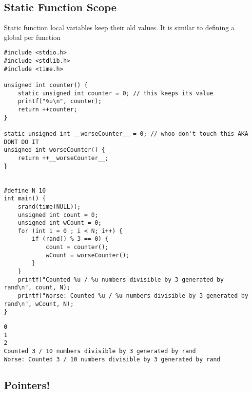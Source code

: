\documentclass[11pt]{article}
\begin{document}
\subsection{Static Function Scope}
\label{sec:org18c383b}

Static function local variables keep their old values. It is similar
to defining a global per function

\begin{verbatim}
#include <stdio.h>
#include <stdlib.h>
#include <time.h>

unsigned int counter() {
    static unsigned int counter = 0; // this keeps its value
    printf("%u\n", counter);
    return ++counter;
}

static unsigned int __worseCounter__ = 0; // whoo don't touch this AKA DONT DO IT
unsigned int worseCounter() {
    return ++__worseCounter__;
}


#define N 10
int main() {
    srand(time(NULL));
    unsigned int count = 0;
    unsigned int wCount = 0;
    for (int i = 0 ; i < N; i++) {
        if (rand() % 3 == 0) {
            count = counter();
            wCount = worseCounter();
        }
    }
    printf("Counted %u / %u numbers divisible by 3 generated by rand\n", count, N);
    printf("Worse: Counted %u / %u numbers divisible by 3 generated by rand\n", wCount, N);
}
\end{verbatim}

\begin{verbatim}
0
1
2
Counted 3 / 10 numbers divisible by 3 generated by rand
Worse: Counted 3 / 10 numbers divisible by 3 generated by rand
\end{verbatim}

\subsection{Pointers!}
\label{sec:org99b7042}
\end{document}

